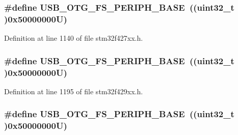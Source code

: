 \subsubsection[{\texorpdfstring{U\+S\+B\+\_\+\+O\+T\+G\+\_\+\+F\+S\+\_\+\+P\+E\+R\+I\+P\+H\+\_\+\+B\+A\+SE}{USB_OTG_FS_PERIPH_BASE}}]{\setlength{\rightskip}{0pt plus 5cm}\#define U\+S\+B\+\_\+\+O\+T\+G\+\_\+\+F\+S\+\_\+\+P\+E\+R\+I\+P\+H\+\_\+\+B\+A\+SE~((uint32\+\_\+t )0x50000000\+U)}\hypertarget{group___peripheral__memory__map_gaa86d4c80849a74938924e73937b904e7}{}\label{group___peripheral__memory__map_gaa86d4c80849a74938924e73937b904e7}


Definition at line 1140 of file stm32f427xx.\+h.

\subsubsection[{\texorpdfstring{U\+S\+B\+\_\+\+O\+T\+G\+\_\+\+F\+S\+\_\+\+P\+E\+R\+I\+P\+H\+\_\+\+B\+A\+SE}{USB_OTG_FS_PERIPH_BASE}}]{\setlength{\rightskip}{0pt plus 5cm}\#define U\+S\+B\+\_\+\+O\+T\+G\+\_\+\+F\+S\+\_\+\+P\+E\+R\+I\+P\+H\+\_\+\+B\+A\+SE~((uint32\+\_\+t )0x50000000\+U)}\hypertarget{group___peripheral__memory__map_gaa86d4c80849a74938924e73937b904e7}{}\label{group___peripheral__memory__map_gaa86d4c80849a74938924e73937b904e7}


Definition at line 1195 of file stm32f429xx.\+h.

\subsubsection[{\texorpdfstring{U\+S\+B\+\_\+\+O\+T\+G\+\_\+\+F\+S\+\_\+\+P\+E\+R\+I\+P\+H\+\_\+\+B\+A\+SE}{USB_OTG_FS_PERIPH_BASE}}]{\setlength{\rightskip}{0pt plus 5cm}\#define U\+S\+B\+\_\+\+O\+T\+G\+\_\+\+F\+S\+\_\+\+P\+E\+R\+I\+P\+H\+\_\+\+B\+A\+SE~((uint32\+\_\+t )0x50000000\+U)}\hypertarget{group___peripheral__memory__map_gaa86d4c80849a74938924e73937b904e7}{}\label{group___peripheral__memory__map_gaa86d4c80849a74938924e73937b904e7}



